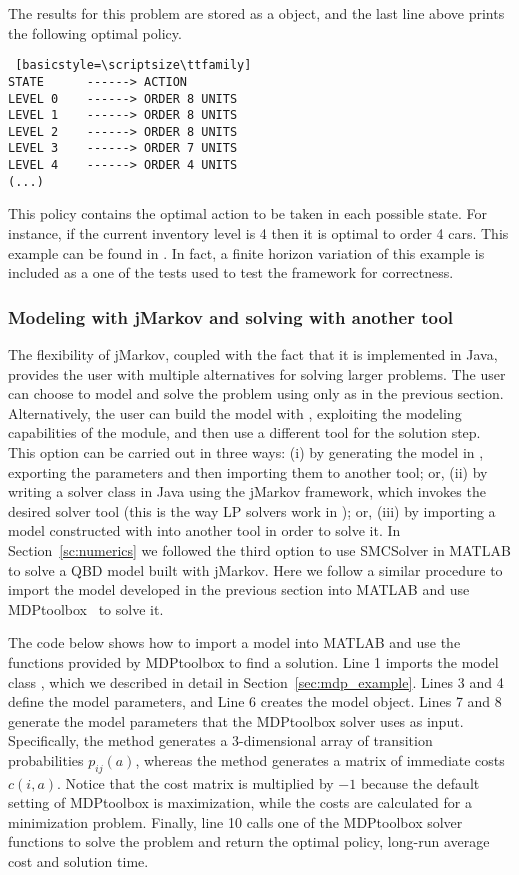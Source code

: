 The results for this problem are stored as a  object, and the
last line above prints the following optimal policy.


\begin{lstlisting} [basicstyle=\scriptsize\ttfamily]
STATE      ------> ACTION
LEVEL 0    ------> ORDER 8 UNITS
LEVEL 1    ------> ORDER 8 UNITS
LEVEL 2    ------> ORDER 8 UNITS
LEVEL 3    ------> ORDER 7 UNITS
LEVEL 4    ------> ORDER 4 UNITS
(...)
\end{lstlisting}
This policy contains the optimal action to be taken in each possible state. 
For instance, if the current inventory level is 4 then it is optimal to order 4
cars. This example can be found  in \cite{jMarkovWeb}. In fact, a finite
horizon variation of this example is included as a one of the 
 tests used to test the framework for correctness. 


\subsubsection{Modeling with jMarkov and solving with another tool}
The flexibility of jMarkov, coupled with the fact that it is implemented in
Java, provides the user with multiple alternatives for solving larger problems.
The user can choose to model and solve the problem using only \jMDP as in the
previous section.  Alternatively, the user can build the model with \jMDP, 
exploiting the modeling capabilities of the module, 
and then use a different tool for the solution step. 
This option can be carried out in three ways: 
(i) by generating the
model in \jMDP, exporting the parameters and then importing them to another tool; 
or, 
(ii) by writing a solver class in Java using the jMarkov
framework, which invokes the desired solver tool (this is the way LP solvers
work in \jMDP); 
or, 
(iii) by importing a model constructed with \jMDP into
another tool in order to solve it. In Section~\ref{sc:numerics} we followed
the third option to use SMCSolver in MATLAB to solve a QBD model built with jMarkov. 
Here we follow a similar procedure to import the \jMDP model developed in the previous section into MATLAB and use
MDPtoolbox~\cite{chad.chap.ea2014} to solve it. 

The code below shows how to import a \jMDP model into MATLAB and use the
functions provided by MDPtoolbox to find a solution. Line 1 imports the model
class , which we described in detail in Section~\ref{sec:mdp_example}. 
Lines 3 and 4 define the model parameters, and Line 6 creates the model object.
Lines 7 and 8 generate the model parameters that the MDPtoolbox solver uses as
input. Specifically, the method  generates a 3-dimensional
array of transition probabilities $p_{ij}(a)$, whereas the method 
generates a matrix of immediate costs $c(i,a)$. 
Notice that the cost matrix is multiplied by $-1$ because the default setting of MDPtoolbox is maximization, while the costs
are calculated for a minimization problem. Finally, line 10 calls one of the
MDPtoolbox solver functions to solve the problem and return the optimal policy,
long-run average cost and solution time. 

